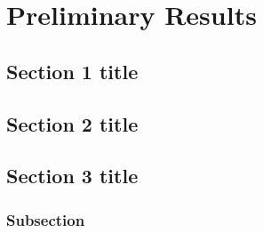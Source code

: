 \chapter{Preliminary Results}

\section{Section 1 title}

\section{Section 2 title}

\section{Section 3 title}

\subsection{Subsection}